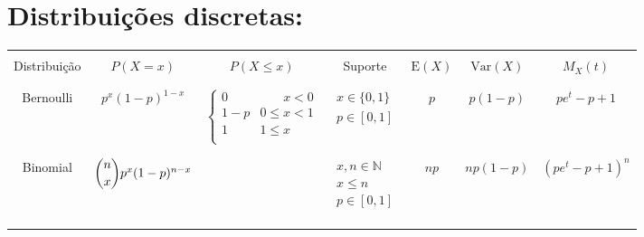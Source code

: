 \documentclass[12pt]{article}
\begin{document}
\setcounter{secnumdepth}{0}
\newcommand{\ts}[1]{@{\hspace{#1cm}}}


\section{Distribuições discretas:}

\begin{tabular}{| c | c | c | c | c | c | c |}

	                               \hline \rule{0pt}{0pt} & & & & & & \\
	Distribuição &
	$P(X = x)$ &
	$P(X \leq x)$ &
	Suporte &
	$\text{E}(X)$ &
	$\text{Var}(X)$ &
	$M_X(t)$ \\

	\rule{0pt}{0pt} & & & & & & \\ \hline \rule{0pt}{0pt} & & & & & & \\

 	Bernoulli &
 	$p^x (1-p)^{1-x}$ &
 	$\begin{cases}
 		0   & \quad\;\;\; x < 0 \\
 		1-p &      0 \leq x < 1 \\
 		1   &      1 \leq x \\
 	\end{cases}$ &
 	$\begin{matrix}
 		x \in \{0,1\} \\
 		p \in [0,1] \\
 	\end{matrix}$ &
    $p$ &
    $p (1-p)$ &
    $pe^t - p + 1$ \\

    \rule{0pt}{0pt} & & & & & & \\ \hline \rule{0pt}{0pt} & & & & & & \\

    Binomial &
    $\dbinom{n}{x} p^x (1-p)^{n-x}$ &
    &
    $\begin{matrix}
    	x,n \in \mathds N \\
    	x \leq n \\
    	p \in [0,1] \\
    \end{matrix}$ &
    $np$ &
    $np (1-p)$ &
    $(pe^t - p + 1)^n$ \\

    \rule{0pt}{0pt} & & & & & & \\ \hline \rule{0pt}{0pt} & & & & & & \\


\end{tabular}
\end{document}
